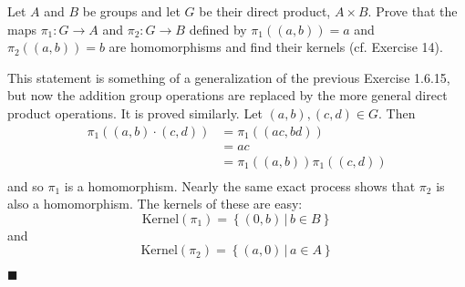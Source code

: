 \documentclass[12pt]{article}
\renewcommand{\qed}{\hfill$\blacksquare$}
\renewenvironment{proof}{\begin{addmargin}[1em]{0em}\begin{newproof}}{\end{newproof}\end{addmargin}\qed}
\newenvironment{problem}[2][Exercise]{\begin{trivlist}
\item[\hskip \labelsep {\bfseries #1}\hskip \labelsep {\bfseries #2.}]}{\end{trivlist}}
\begin{document}
\begin{problem}{1.6.16}
Let $A$ and $B$ be groups and let $G$ be their direct product, $A\times B$. Prove that the maps $\pi_1:G\rightarrow A$ and $\pi_2:G \rightarrow B$ defined by $\pi_1\left(\left(a,b\right)\right) = a$ and $\pi_2\left(\left(a,b\right)\right)=b$ are homomorphisms and find their kernels (cf. Exercise 14).
\end{problem}
\begin{proof}
This statement is something of a generalization of the previous Exercise 1.6.15, but now the addition group operations are replaced by the more general direct product operations. It is proved similarly. Let $\left(a,b\right),\left(c,d\right)\in G$. Then
\begin{equation*}
    \begin{split}
        \pi_1\left(\left(a,b\right)\cdot \left(c,d\right)\right) & = \pi_1\left(\left(ac,bd\right)\right) \\
        & = ac \\
        & = \pi_1\left(\left(a,b\right)\right)\pi_1\left(\left(c,d\right)\right) \\
    \end{split}
\end{equation*}
and so $\pi_1$ is a homomorphism. Nearly the same exact process shows that $\pi_2$ is also a homomorphism. The kernels of these are easy:
$$ \text{Kernel}\left(\pi_1\right) = \left\{ \left(0,b\right)\,|\, b\in B\right\} $$
and
$$ \text{Kernel}\left(\pi_2\right) = \left\{ \left(a,0\right)\,|\, a\in A\right\} $$
\end{proof}
\end{document}
